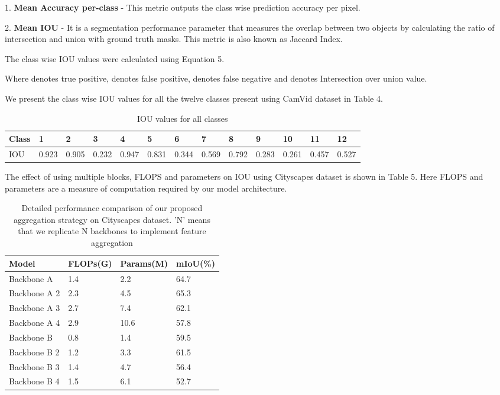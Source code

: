 \documentclass{article}
\begin{document}
1. \textbf{Mean Accuracy per-class} - This metric outputs the class wise prediction accuracy per pixel.

2. \textbf{Mean IOU} - It is a segmentation performance parameter that measures the overlap between two objects by calculating the ratio of intersection and union with ground truth masks. This metric is also known as Jaccard Index. 

The class wise IOU values were calculated using Equation 5.



Where  denotes true positive,  denotes false positive,  denotes false negative and  denotes Intersection over union value.

We present the class wise IOU values for all the twelve classes present using CamVid dataset in Table 4.

\begin{table}[h]
  \caption{IOU values for all classes}
  \label{sample-table4}
  \centering
  \begin{tabular}{lllllllllllll}
  \toprule
    Class &1 &2 &3 &4 &5 &6 &7 &8 &9 &10 &11 &12           \\
    \midrule
    IOU &0.923 &0.905 &0.232 &0.947 &0.831 &0.344 &0.569& 0.792 &0.283 &0.261 &0.457 &0.527          \\
    \bottomrule
  \end{tabular}
\end{table}

The effect of using multiple blocks, FLOPS and parameters on IOU using Cityscapes dataset is shown in Table 5. Here FLOPS and parameters are a measure of computation required by our model architecture.

\begin{table}[h]
  \caption{Detailed performance comparison of our proposed aggregation strategy on Cityscapes dataset. ’N’ means that we replicate N backbones to implement feature aggregation}
  \label{sample-table5}
  \centering
  \begin{tabular}{llll}
  \toprule
    Model &FLOPs(G) &Params(M) &mIoU(\%)\\
   \midrule
    Backbone A &1.4 &2.2 &64.7\\
Backbone A 2 &2.3  &4.5 &65.3\\
Backbone A 3 &2.7 &7.4 &62.1\\
Backbone A 4 &2.9 &10.6 &57.8\\
Backbone B &0.8 &1.4 &59.5\\
Backbone B 2 &1.2 &3.3 &61.5\\
Backbone B 3 &1.4 &4.7 &56.4\\
Backbone B 4 &1.5 &6.1 &52.7\\
    \bottomrule
  \end{tabular}
\end{table}
\end{document}
